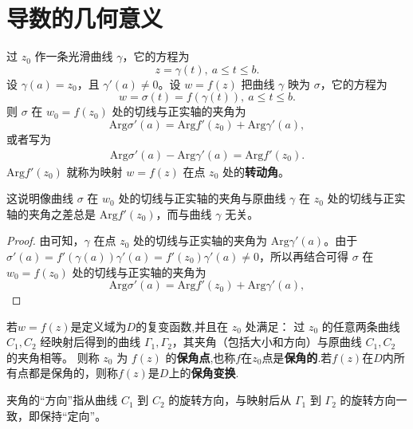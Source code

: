 \documentclass[../../main.tex]{subfiles}%
\begin{document}
\section{导数的几何意义}

\begin{proposition}
过 \( z_0 \) 作一条光滑曲线 \( \gamma \)，它的方程为  
\[ z = \gamma(t),\ a \leqslant t \leqslant b. \]  
设 \( \gamma(a) = z_0 \)，且 \( \gamma'(a) \neq 0 \)。设 \( w = f(z) \) 把曲线 \( \gamma \) 映为 \( \sigma \)，它的方程为  
\[ w = \sigma(t) = f(\gamma(t)),\ a \leqslant t \leqslant b. \]  
则 \( \sigma \) 在 \( w_0 = f(z_0) \) 处的切线与正实轴的夹角为  
\[ \mathrm{Arg}\sigma'(a) = \mathrm{Arg} f'(z_0) + \mathrm{Arg} \gamma'(a), \]  
或者写为  
\begin{align}
\mathrm{Arg} \sigma'(a) - \mathrm{Arg} \gamma'(a) = \mathrm{Arg} f'(z_0). \label{equation----:::2.1}
\end{align}
\( \mathrm{Arg} f'(z_0) \) 就称为映射 \( w = f(z) \) 在点 \( z_0 \) 处的\textbf{转动角}。
\end{proposition}
\begin{note}
这说明像曲线 \( \sigma \) 在 \( w_0 \) 处的切线与正实轴的夹角与原曲线 \( \gamma \) 在 \( z_0 \) 处的切线与正实轴的夹角之差总是 \( \mathrm{Arg} f'(z_0) \)，而与曲线 \( \gamma \) 无关。
\end{note}
\begin{proof}
由可知，\( \gamma \) 在点 \( z_0 \) 处的切线与正实轴的夹角为 \( \mathrm{Arg} \gamma'(a) \)。由于 \( \sigma'(a) = f'(\gamma(a))\gamma'(a) = f'(z_0)\gamma'(a) \neq 0 \)，所以再结合可得 \( \sigma \) 在 \( w_0 = f(z_0) \) 处的切线与正实轴的夹角为  
\[ \mathrm{Arg}\sigma'(a) = \mathrm{Arg} f'(z_0) + \mathrm{Arg} \gamma'(a), \]  
\end{proof}

\begin{definition}
若\( w = f(z) \)是定义域为$D$的复变函数,并且在 \( z_0 \) 处满足：  
过 \( z_0 \) 的任意两条曲线 \( C_1, C_2 \) 经映射后得到的曲线 \( \Gamma_1, \Gamma_2 \)，其夹角（包括大小和方向）与原曲线 \( C_1, C_2 \) 的夹角相等。  
则称 \( z_0 \) 为 \( f(z) \) 的\textbf{保角点},也称$f$在$z_0$点是\textbf{保角的}.若\(f(z)\)在$D$内所有点都是保角的，则称\(f(z)\)是$D$上的\textbf{保角变换}.
\end{definition}
\begin{remark}
夹角的“方向”指从曲线 \( C_1 \) 到 \( C_2 \) 的旋转方向，与映射后从 \( \Gamma_1 \) 到 \( \Gamma_2 \) 的旋转方向一致，即保持“定向”。
\end{remark}
\end{document}
